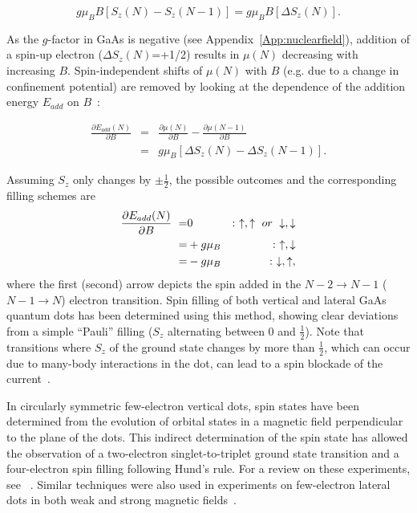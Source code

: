 \documentclass[rmp,twocolumn,aps]{revtex4}
\begin{document}
\begin{equation}
     g \mu_B B \left[S_z(N)-S_z(N\!-\!1)\right] = g \mu_B B \left[ \Delta S_z(N)\right].
\end{equation}

As the $g$-factor in GaAs is negative (see
Appendix~\ref{App:nuclearfield}), addition of a spin-up electron
($\Delta S_z(N)$=+1/2) results in $\mu(N)$ decreasing with
increasing $B$. Spin-independent shifts of $\mu(N)$ with $B$ (e.g.
due to a change in confinement potential) are removed by looking
at the dependence of the addition energy $E_{add}$ on
$B$~\cite{WeisPRL1993}:

\begin{eqnarray}
    \frac{\partial E_{add}(N)}{\partial B}&=&\frac{\partial\mu(N)}{\partial B}-\frac{\partial\mu(N\!-\!1)}{\partial B}\nonumber \\
    &=& g \mu_B \left[ \Delta S_z(N)-\Delta S_z(N\!-\!1) \right].
\end{eqnarray}

Assuming $S_z$ only changes by $\pm\frac{1}{2}$, the possible
outcomes and the corresponding filling schemes are
\begin{eqnarray*}
 \frac{\partial E_{add}(N)}{\partial B}\ =&0 &:\ \ua, \ua \ or\ \da , \da \\
=& +g \mu_B &:\ \ua, \da \\
=& -g \mu_B &:\ \da , \ua ,
\end{eqnarray*}
where the first (second) arrow depicts the spin added in the
$N\!-\!2 \rightarrow N\!-\!1$ ($N\!-\!1 \rightarrow N$) electron
transition. Spin filling of both vertical \cite{Sasaki98} and
lateral GaAs quantum dots \cite{Duncan00,Lindmann02,PotokPRL2003}
has been determined using this method, showing clear deviations
from a simple ``Pauli'' filling ($S_z$ alternating between 0 and
$\frac{1}{2}$). Note that transitions where $S_z$ of the ground state changes by more
than $\frac{1}{2}$, which can occur due to many-body interactions in the dot, can lead to a spin blockade of the
current~\cite{Weinmann, KorkusinskiPRL2004}.

In circularly symmetric few-electron vertical dots, spin states
have been determined from the evolution of orbital states in a
magnetic field perpendicular to the plane of the dots. This
indirect determination of the spin state has allowed the
observation of a two-electron singlet-to-triplet ground state
transition and a four-electron spin filling following Hund's rule.
For a review on these experiments, see ~\textcite{kouwenhoven01}.
Similar techniques were also used in experiments on few-electron lateral dots in both weak and strong magnetic fields~\cite{CiorgaPRB2000,Kyriakidis02}.
\end{document}
